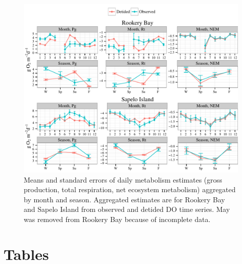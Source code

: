 \documentclass[letterpaper,12pt,oneside]{article}\usepackage[]{graphicx}\usepackage[]{color}
\makeatletter
\def\maxwidth{ %
  \ifdim\Gin@nat@width>\linewidth
    \linewidth
  \else
    \Gin@nat@width
  \fi
}
\newenvironment{knitrout}{}{} %
\makeatother
\begin{document}
\centering\vspace*{\fill}
\begin{knitrout}
\color{fgcolor}\begin{figure}[!ht]


{\centering \includegraphics[width=\maxwidth]{figure/metab_sum2} 

}

\caption[Means and standard errors of daily metabolism estimates (gross production, total respiration, net ecosystem metabolism) aggregated by month and season]{Means and standard errors of daily metabolism estimates (gross production, total respiration, net ecosystem metabolism) aggregated by month and season.  Aggregated estimates are for Rookery Bay and Sapelo Island from observed and detided \ac{DO} time series.  May was removed from Rookery Bay because of incomplete data.\label{fig:metab_sum2}}
\end{figure}


\end{knitrout}
\vfill
\clearpage


\section{Tables}
\end{document}
